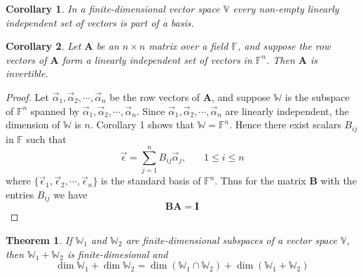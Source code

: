 \documentclass{article}
\newtheorem{theorem}{Theorem}
\newtheorem{corollary}{Corollary}
\begin{document}
    \begin{corollary}
        In a finite-dimensional vector space \(\mathbb{V}\) every non-empty linearly 
        independent set of vectors is part of a basis.
    \end{corollary}
    \begin{corollary}
        Let \(\mathbf{A}\) be an \(n \times n\) matrix over a field \(\mathbb{F}\), 
        and suppose the row vectors of \(\mathbf{A}\) form a linearly independent set 
        of vectors in \(\mathbb{F}^n\). Then \(\mathbf{A}\) is invertible. 
    \end{corollary}
    \begin{proof}
        Let \(\vec{\alpha}_1, \vec{\alpha}_2, \cdots, \vec{\alpha}_n\) be the row 
        vectors of \(\mathbf{A}\), and suppose \(\mathbb{W}\) is the subspace of 
        \(\mathbb{F}^n\) spanned by \(\vec{\alpha}_1, \vec{\alpha}_2, \cdots, \vec{\alpha}_n\). 
        Since \(\vec{\alpha}_1, \vec{\alpha}_2, \cdots, \vec{\alpha}_n\) are linearly 
        independent, the dimension of \(\mathbb{W}\) is \(n\). Corollary 1 shows that 
        \(\mathbb{W}=\mathbb{F}^n\). Hence there exist scalars \(B_{ij}\) in \(\mathbb{F}\) 
        such that 
        \begin{equation*}
            \vec{\epsilon} = \sum_{j=1}^{n} B_{ij}\vec{\alpha}_j,\ \ \ \ \ \ \ \ 1 \leq i \leq n
        \end{equation*}
        where \(\{\vec{\epsilon}_1, \vec{\epsilon}_2, \cdots, \vec{\epsilon}_n\}\) is the 
        standard basis of \(\mathbb{F}^n\). Thus for the matrix \(\mathbf{B}\) with the 
        entries \(B_{ij}\) we have \[\mathbf{B}\mathbf{A}=\mathbf{I}\]
    \end{proof}
    \begin{theorem}
        If \(\mathbb{W}_1\) and \(\mathbb{W}_2\) are finite-dimensional subspaces of 
        a vector space \(\mathbb{V}\), then \(\mathbb{W}_1+\mathbb{W}_2\) is finite-dimesional 
        and 
        \begin{equation*}
            \dim{\mathbb{W}_1} + \dim{\mathbb{W}_2} = \dim{(\mathbb{W}_1 \cap \mathbb{W}_2)} + \dim{(\mathbb{W}_1 + \mathbb{W}_2)}
        \end{equation*}
    \end{theorem}
\end{document}
